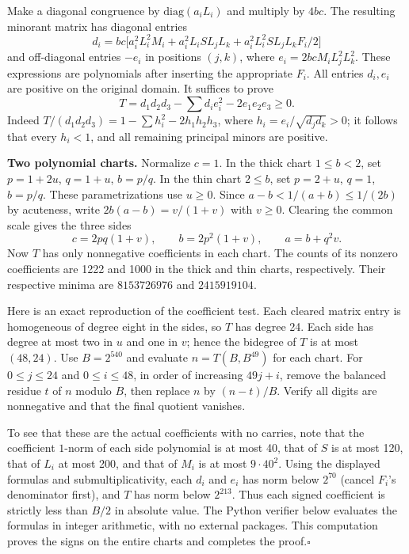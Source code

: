 \documentclass[11pt,a4paper]{article}
\numberwithin{equation}{section}
\theoremstyle{definition}
\theoremstyle{remark}
\begin{document}
Make a diagonal congruence by $\mathrm{diag}(a_iL_i)$ and multiply by $4bc$. The resulting minorant matrix has diagonal entries
\[
 d_i=bc\bigl[a_i^2 L_i^2 M_i+a_i^2 L_i S L_j L_k
        +a_i^2 L_i^2 S L_j L_k F_i/2\bigr]
\]
and off-diagonal entries $-e_i$ in positions $(j,k)$, where
$e_i=2bc M_iL_j^2L_k^2$. These expressions are polynomials after inserting the appropriate $F_i$. All entries $d_i,e_i$ are positive on the original domain. It suffices to prove
\[
 T=d_1d_2d_3-\sum d_i e_i^2-2e_1e_2e_3\ge0.
\]
Indeed $T/(d_1d_2d_3)=1-\sum h_i^2-2h_1h_2h_3$, where $h_i=e_i/\sqrt{d_jd_k}>0$; it follows that every $h_i<1$, and all remaining principal minors are positive.

\textbf{Two polynomial charts.} Normalize $c=1$. In the thick chart $1\le b<2$, set $p=1+2u$, $q=1+u$, $b=p/q$. In the thin chart $2\le b$, set $p=2+u$, $q=1$, $b=p/q$. These parametrizations use $u\ge0$. Since
$a-b<1/(a+b)\le1/(2b)$ by acuteness, write $2b(a-b)=v/(1+v)$ with $v\ge0$. Clearing the common scale gives the three sides
\[
 c=2pq(1+v),\qquad b=2p^2(1+v),\qquad a=b+q^2v.
\]
Now $T$ has only nonnegative coefficients in each chart. The counts of its nonzero coefficients are 1222 and 1000 in the thick and thin charts, respectively. Their respective minima are $8153726976$ and $2415919104$.

Here is an exact reproduction of the coefficient test. Each cleared matrix entry is homogeneous of degree eight in the sides, so $T$ has degree 24. Each side has degree at most two in $u$ and one in $v$; hence the bidegree of $T$ is at most $(48,24)$. Use $B=2^{540}$ and evaluate $n=T(B,B^{49})$ for each chart. For $0\le j\le24$ and $0\le i\le48$, in order of increasing $49j+i$, remove the balanced residue $t$ of $n$ modulo $B$, then replace $n$ by $(n-t)/B$. Verify all digits are nonnegative and that the final quotient vanishes.

To see that these are the actual coefficients with no carries, note that the coefficient $1$-norm of each side polynomial is at most 40, that of $S$ is at most 120, that of $L_i$ at most 200, and that of $M_i$ is at most $9\cdot40^2$. Using the displayed formulas and submultiplicativity, each $d_i$ and $e_i$ has norm below $2^{70}$ (cancel $F_i$'s denominator first), and $T$ has norm below $2^{213}$. Thus each signed coefficient is strictly less than $B/2$ in absolute value. The Python verifier below evaluates the formulas in integer arithmetic, with no external packages. This computation proves the signs on the entire charts and completes the proof.\hfill$\square$
\end{document}
